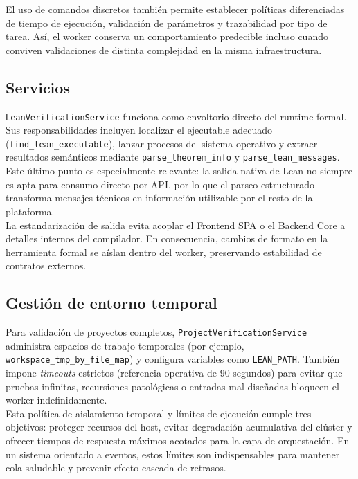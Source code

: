 \documentclass[12pt, letterpaper]{article}
\begin{document}
El uso de comandos discretos también permite establecer políticas diferenciadas de tiempo de ejecución, validación de parámetros y trazabilidad por tipo de tarea. Así, el worker conserva un comportamiento predecible incluso cuando conviven validaciones de distinta complejidad en la misma infraestructura.

\subsection{Servicios}

\texttt{LeanVerificationService} funciona como envoltorio directo del runtime formal. Sus responsabilidades incluyen localizar el ejecutable adecuado (\texttt{find\_lean\_executable}), lanzar procesos del sistema operativo y extraer resultados semánticos mediante \texttt{parse\_theorem\_info} y \texttt{parse\_lean\_messages}. Este último punto es especialmente relevante: la salida nativa de Lean no siempre es apta para consumo directo por API, por lo que el parseo estructurado transforma mensajes técnicos en información utilizable por el resto de la plataforma.\\

La estandarización de salida evita acoplar el Frontend SPA o el Backend Core a detalles internos del compilador. En consecuencia, cambios de formato en la herramienta formal se aíslan dentro del worker, preservando estabilidad de contratos externos.

\subsection{Gestión de entorno temporal}

Para validación de proyectos completos, \texttt{ProjectVerificationService} administra espacios de trabajo temporales (por ejemplo, \texttt{workspace\_tmp\_by\_file\_map}) y configura variables como \texttt{LEAN\_PATH}. También impone \textit{timeouts} estrictos (referencia operativa de 90 segundos) para evitar que pruebas infinitas, recursiones patológicas o entradas mal diseñadas bloqueen el worker indefinidamente.\\

Esta política de aislamiento temporal y límites de ejecución cumple tres objetivos: proteger recursos del host, evitar degradación acumulativa del clúster y ofrecer tiempos de respuesta máximos acotados para la capa de orquestación. En un sistema orientado a eventos, estos límites son indispensables para mantener cola saludable y prevenir efecto cascada de retrasos.
\end{document}
